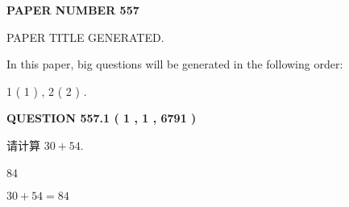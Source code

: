 \documentclass{ctexart}
\begin{document}
   
   
   
\newpage 
\setcounter{page}{ 
   557001 } 
   
   
   
   
 {\textbf{ \Large{ PAPER NUMBER  557  }}}
   
   
\vspace{0.2in}
   
   
   
   
   
   
   
   
 \vspace{0.2in}
 
 
 
 
   
   
 PAPER TITLE GENERATED.
   
   
   
\vspace{0.2in}
   
In this paper, big questions will be generated in the following order: 
   
   
   1 ( 1 )
 ,
   2 ( 2 )
 .
  
\vspace{0.2in}
  
{\textbf{\Large{QUESTION
557.1 
 ( 1 , 1 , 6791 )
}}}
  
  
 
请计算 $ %
30 +  %
54 $.
 
 
 
\noindent{}
 
 

84
 
 
\noindent{}
 
 

 
 
 
\noindent{}
 
 

$ %
30 +  %
54=   %
84$
 
 
\noindent{}
 
 

 
   
   
   
\end{document}
